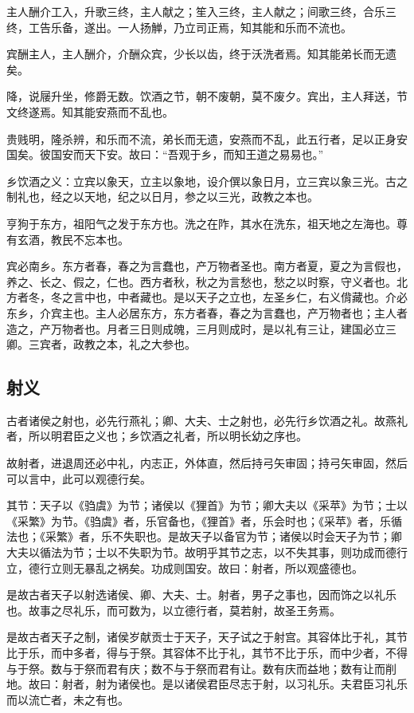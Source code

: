 \documentclass[]{article}
\begin{document}
主人酬介工入，升歌三终，主人献之；笙入三终，主人献之；间歌三终，合乐三终，工告乐备，遂出。一人扬觯，乃立司正焉，知其能和乐而不流也。

宾酬主人，主人酬介，介酬众宾，少长以齿，终于沃洗者焉。知其能弟长而无遗矣。

降，说屦升坐，修爵无数。饮酒之节，朝不废朝，莫不废夕。宾出，主人拜送，节文终遂焉。知其能安燕而不乱也。

贵贱明，隆杀辨，和乐而不流，弟长而无遗，安燕而不乱，此五行者，足以正身安国矣。彼国安而天下安。故曰：``吾观于乡，而知王道之易易也。''

乡饮酒之义：立宾以象天，立主以象地，设介僎以象日月，立三宾以象三光。古之制礼也，经之以天地，纪之以日月，参之以三光，政教之本也。

亨狗于东方，祖阳气之发于东方也。洗之在阼，其水在洗东，祖天地之左海也。尊有玄酒，教民不忘本也。

宾必南乡。东方者春，春之为言蠢也，产万物者圣也。南方者夏，夏之为言假也，养之、长之、假之，仁也。西方者秋，秋之为言愁也，愁之以时察，守义者也。北方者冬，冬之言中也，中者藏也。是以天子之立也，左圣乡仁，右义偝藏也。介必东乡，介宾主也。主人必居东方，东方者春，春之为言蠢也，产万物者也；主人者造之，产万物者也。月者三日则成魄，三月则成时，是以礼有三让，建国必立三卿。三宾者，政教之本，礼之大参也。

\hypertarget{header-n933}{%
\subsection{射义}\label{header-n933}}

古者诸侯之射也，必先行燕礼；卿、大夫、士之射也，必先行乡饮酒之礼。故燕礼者，所以明君臣之义也；乡饮酒之礼者，所以明长幼之序也。

故射者，进退周还必中礼，内志正，外体直，然后持弓矢审固；持弓矢审固，然后可以言中，此可以观德行矣。

其节：天子以《驺虞》为节；诸侯以《狸首》为节；卿大夫以《采苹》为节；士以《采繁》为节。《驺虞》者，乐官备也，《狸首》者，乐会时也；《采苹》者，乐循法也；《采繁》者，乐不失职也。是故天子以备官为节；诸侯以时会天子为节；卿大夫以循法为节；士以不失职为节。故明乎其节之志，以不失其事，则功成而德行立，德行立则无暴乱之祸矣。功成则国安。故曰：射者，所以观盛德也。

是故古者天子以射选诸侯、卿、大夫、士。射者，男子之事也，因而饰之以礼乐也。故事之尽礼乐，而可数为，以立德行者，莫若射，故圣王务焉。

是故古者天子之制，诸侯岁献贡士于天子，天子试之于射宫。其容体比于礼，其节比于乐，而中多者，得与于祭。其容体不比于礼，其节不比于乐，而中少者，不得与于祭。数与于祭而君有庆；数不与于祭而君有让。数有庆而益地；数有让而削地。故曰：射者，射为诸侯也。是以诸侯君臣尽志于射，以习礼乐。夫君臣习礼乐而以流亡者，未之有也。
\end{document}
